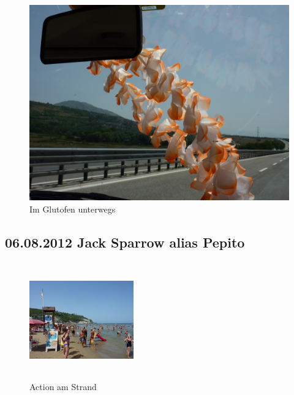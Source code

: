 \begin{figure}[H]
    \centering
    \includegraphics[width=\textwidth]{../Bilder/Sommer2012/11.jpg}
    \caption{Im Glutofen unterwegs}
    \label{img:Sommer3}
\end{figure}

\subsection{06.08.2012 Jack Sparrow alias Pepito}

\begin{figure} 
  \begin{centering}
    \includegraphics[width=0.4\textwidth, height=5cm, keepaspectratio]{../Bilder/Sommer2012/13.jpg}
    \caption{Action am Strand}
  \end{centering}
\end{figure} 

